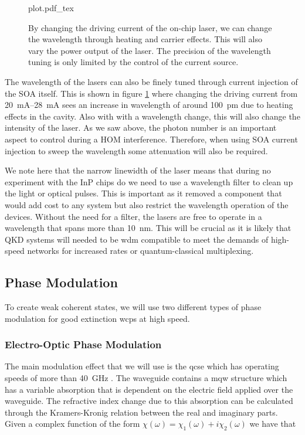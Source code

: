 \begin{figure}[tp]
	\centering
	\small	
	\def\svgwidth{0.9\textwidth} 
	{plot.pdf_tex}
	\caption[Laser wavelength current-injection sweep]{By changing the driving current of the on-chip laser, we can change the wavelength through heating and carrier effects. This will also vary the power output of the laser. The precision of the wavelength tuning is only limited by the control of the current source.}
	\label{fig:curr_sweep}
\end{figure}

The wavelength of the lasers can also be finely tuned through current injection of the \ac{SOA} itself. This is shown in figure \ref{fig:curr_sweep} where changing the driving current from \SIrange{20}{28}{mA} sees an increase in wavelength of around \SI{100}{pm} due to heating effects in the cavity. Also with with a wavelength change, this will also change the intensity of the laser. As we saw above, the photon number is an important aspect to control during a \ac{HOM} interference. Therefore, when using \ac{SOA} current injection to sweep the wavelength some attenuation will also be required. 

We note here that the narrow linewidth of the laser means that during no experiment with the \ac{InP} chips do we need to use a wavelength filter to clean up the light or optical pulses. This is important as it removed a component that would add cost to any system but also restrict the wavelength operation of the devices. Without the need for a filter, the lasers are free to operate in a wavelength that spans more than \SI{10}{nm}. This will be crucial as it is likely that \ac{QKD} systems will needed to be \ac{wdm} compatible to meet the demands of high-speed networks for increased rates or quantum-classical multiplexing.

\subsection{Phase Modulation}

To create weak coherent states, we will use two different types of phase modulation for good extinction \acp{wcp} at high speed. 

\subsubsection{Electro-Optic Phase Modulation}

The main modulation effect that we will use is the \ac{qcse} which has operating speeds of more than \SI{40}{GHz} \cite{qcse, smit2014}. The waveguide contains a \ac{mqw} structure which has a variable absorption that is dependent on the electric field applied over the waveguide. The refractive index change due to this absorption can be calculated through the Kramers-Kronig relation between the real and imaginary parts. Given a complex function of the form $\chi(\omega) = \chi_1(\omega) + i \chi_2(\omega)$ we have that

